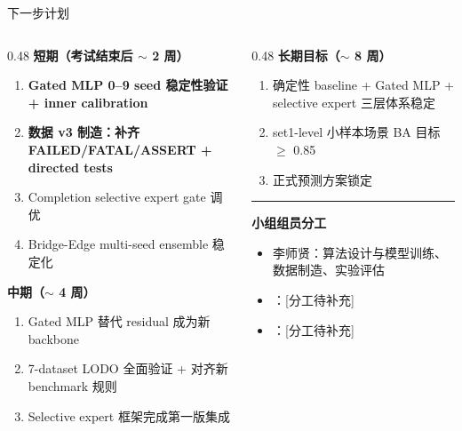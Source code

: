 \documentclass[aspectratio=169,UTF8]{ctexbeamer}
\newcommand{\key}[1]{\textcolor{ICCADBlue}{\textbf{#1}}}
\begin{document}
\begin{frame}{下一步计划}
  \small
  \begin{columns}[T]
    \begin{column}{0.48\textwidth}
      \textbf{短期（考试结束后 $\sim$ 2 周）}
      \begin{enumerate}
        \item \key{Gated MLP 0--9 seed 稳定性验证 + inner calibration}
        \item \key{数据 v3 制造：补齐 FAILED/FATAL/ASSERT + directed tests}
        \item Completion selective expert gate 调优
        \item Bridge-Edge multi-seed ensemble 稳定化
      \end{enumerate}
      \vspace{2mm}
      \textbf{中期（$\sim$ 4 周）}
      \begin{enumerate}
        \item Gated MLP 替代 residual 成为新 backbone
        \item 7-dataset LODO 全面验证 + 对齐新 benchmark 规则
        \item Selective expert 框架完成第一版集成
      \end{enumerate}
    \end{column}
    \begin{column}{0.48\textwidth}
      \textbf{长期目标（$\sim$ 8 周）}
      \begin{enumerate}
        \item 确定性 baseline + Gated MLP + selective expert 三层体系稳定
        \item set1-level 小样本场景 BA 目标 $\ge$ 0.85
        \item 正式预测方案锁定
      \end{enumerate}

      \vspace{3mm}
      {\color{ICCADBlue}\hrule}
      \vspace{3mm}
      \textbf{小组组员分工}
      \begin{itemize}
        \item 李师贤：算法设计与模型训练、数据制造、实验评估
        \item [组员 2]：[分工待补充]
        \item [组员 3]：[分工待补充]
      \end{itemize}
    \end{column}
  \end{columns}
\end{frame}
\end{document}

